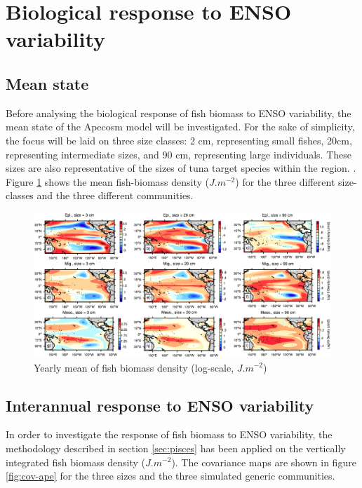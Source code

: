 \section{Biological response to ENSO variability}

\subsection{Mean state}

Before analysing the biological response of fish biomass to ENSO variability, the mean state of the Apecosm model will be investigated.
For the sake of simplicity, the focus will be laid on three size classes: 2 cm, representing small fishes, 20cm, representing intermediate sizes, and 90 cm, representing large individuals. These sizes are also
representative of the sizes of tuna target species within the region.
.  \\ 

Figure \ref{fig:mean-ape} shows the mean fish-biomass density ($J.m^{-2}$) for the three different size-classes and the three different communities.

\begin{figure}[h!]
    \centering
    \includegraphics[width=\textwidth] {figs/debugged_corr_mask_mean_maps_OOPE.pdf}
    \caption{Yearly mean of fish biomass density (log-scale, $J.m^{-2}$)}
    \label{fig:mean-ape}
\end{figure}

\subsection{Interannual response to ENSO variability}

In order to investigate the response of fish biomass to ENSO variability, the methodology described in section \ref{sec:pisces} has been applied on the vertically integrated fish biomass density ($J.m^{-2}$). The covariance maps are shown in figure \ref{fig:cov-ape} for the three sizes and the three simulated generic communities. 

